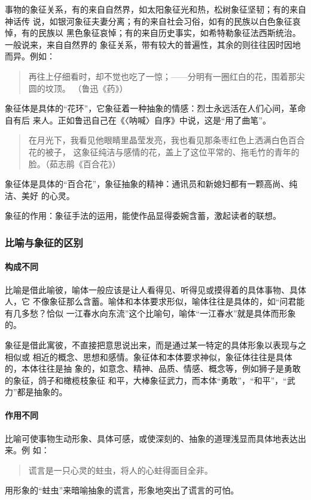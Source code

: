 \documentclass[final,oneside]{ctexbook}
\newenvironment{equotation}{\begin{quotation}\kaishu}{\end{quotation}}
\begin{document}
事物的象征关系，有的来自自然界，如太阳象征光和热，松树象征坚韧；有的来自神话传
说，如银河象征夫妻分离；有的来自社会习俗，如有的民族以白色象征哀悼，有的民族以
黑色象征哀悼；有的来自历史事实，如希特勒象征法西斯统治。一般说来，来自自然界的
象征关系，带有较大的普遍性，其余的则往往因时因地而异。例如：

\begin{equotation}
  再往上仔细看时，却不觉也吃了一惊；——分明有一圈红白的花，围着那尖圆的坟顶。
  （鲁迅《药》）
\end{equotation}
象征体是具体的“花环”，它象征着一种抽象的情感：烈士永远活在人们心间，革命自有后
来人。正如鲁迅自己在《〈呐喊〉自序》中说，这是“用了曲笔”。

\begin{equotation}
  在月光下，我看见他眼睛里晶莹发亮，我也看见那条枣红色上洒满白色百合花的被子，
  这象征纯洁与感情的花，盖上了这位平常的、拖毛竹的青年的脸。（茹志鹃《百合花》）
\end{equotation}
象征体是具体的“百合花”，象征抽象的精神：通讯员和新媳妇都有一颗高尚、纯洁、美好
的心灵。

象征的作用：象征手法的运用，能使作品显得委婉含蓄，激起读者的联想。

\subsubsection{比喻与象征的区别}

\paragraph{构成不同}

比喻是借此喻彼，喻体一般应该是让人看得见、听得见或摸得着的具体事物、具体人，它
不像象征那么含蓄。喻体和本体要求形似，喻体往往是具体的，如“问君能有几多愁？恰似
一江春水向东流”这个比喻句，喻体“一江春水”就是具体而形象的。

象征是借此寓彼，不直接把意思说出来，而是通过某一特定的具体形象以表现与之相似或
相近的概念、思想和感情。象征体和本体要求神似，象征体往往是具体的，本体往往是抽
象的，如意念、精神、品质、情感、概念等，例如狮子是勇敢的象征，鸽子和橄榄枝象征
和平，大棒象征武力，而本体“勇敢”，“和平”，“武力”都是抽象的。

\paragraph{作用不同}

比喻可使事物生动形象、具体可感，或使深刻的、抽象的道理浅显而具体地表达出来。例
如：
\begin{equotation}
  谎言是一只心灵的蛀虫，将人的心蛀得面目全非。
\end{equotation}
用形象的“蛀虫”来暗喻抽象的谎言，形象地突出了谎言的可怕。
\end{document}
